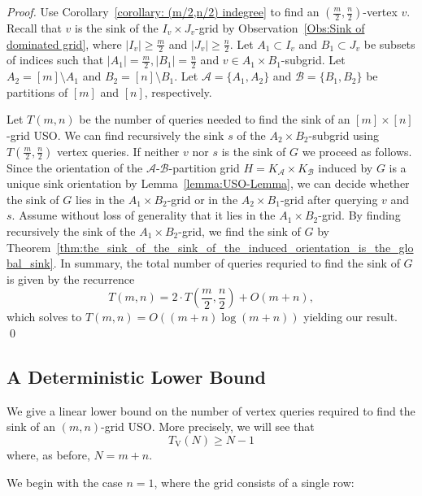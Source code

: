 \documentclass[runningheads,a4paper]{llncs}
\newcommand{\A}{\ensuremath{\mathcal A}}
\newcommand{\B}{\ensuremath{\mathcal B}}
\newcommand{\timeVertex}{\ensuremath{T_\mathrm{V}}}
\begin{document}
\begin{proof}
Use Corollary~\ref{corollary: (m/2,n/2) indegree} to find an $(\frac{m}{2}, \frac{n}{2})$-vertex $v$. 
Recall that $v$ is the sink of the $I_v\times J_v$-grid by Observation~\ref{Obs:Sink of dominated grid}, where $|I_v| \geq \frac{m}{2}$ and $|J_v|\geq \frac{n}{2}$. Let $A_1\subset I_v$ and $B_1\subset J_v$ be subsets of indices such that $|A_1| = \frac{m}{2}, |B_1| = \frac{n}{2}$ and $v\in A_1\times B_1$-subgrid.
Let $A_2= [m]\setminus A_1$ and $B_2 = [n]\setminus B_1$.
Let $\A = \{A_1, A_2\}$ and $\B = \{B_1, B_2\}$ be partitions of $[m]$ and $[n]$, respectively.

Let $T(m, n)$ be the number of queries needed to find the sink of an $[m]\times[n]$-grid USO.
We can find recursively the sink $s$ of the $A_2\times B_2$-subgrid using $T(\frac{m}{2}, \frac{n}{2})$ vertex queries. 
If neither $v$ nor $s$ is the sink of $G$ we proceed as follows.
Since the orientation of the $\A$-$\B$-partition grid $H = K_\A \times K_\B$ induced by $G$ is a unique sink orientation by Lemma~\ref{lemma:USO-Lemma}, we can decide whether the sink of $G$ lies in the $A_1\times B_2$-grid or in the $A_2\times B_1$-grid after querying $v$ and $s$. Assume without loss of generality that it lies in the $A_1\times B_2$-grid.
By finding recursively the sink of the $A_1\times B_2$-grid, we find the sink of $G$ by Theorem~\ref{thm:the_sink_of_the_sink_of_the_induced_orientation_is_the_global_sink}. In summary, the total number of queries requried to find the sink of $G$ is given by the recurrence
$$T(m, n) = 2\cdot T\left(\frac{m}{2}, \frac{n}{2}\right) + O(m+n),$$
which solves to $T(m, n) = O((m+n) \log (m+n))$ yielding our result. \qed
\end{proof}
 
\subsection{A Deterministic Lower Bound}
\label{section:a_deterministic_lower_bound}

We give a linear lower bound on the number of vertex queries required to find
the sink of an $(m,n)$-grid USO.
More precisely, we will see that
\[
    \timeVertex(N) \ge N-1
\]
where, as before, $N = m+n$.

We begin with the case $n=1$, where the grid consists of a single row:
\end{document}
